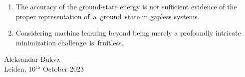 \documentclass[pdftex,a5paper]{dissertation}
\begin{document}
{\begin{enumerate}[leftmargin=*]
\item The accuracy of the ground-state energy is not sufficient evidence of the proper representation of a ground state in gapless systems.

\item Considering machine learning beyond being merely a profoundly intricate minimization challenge is fruitless. 

\end{enumerate}

\vspace{10pt}

\begin{flushright}

Aleksandar Bukva\\
Leiden, 10$^{\text{th}}$ October 2023

\end{flushright}
}
\end{document}
